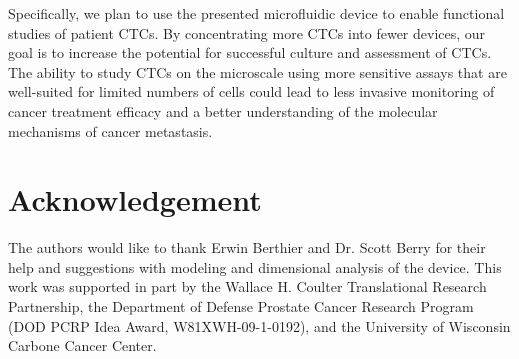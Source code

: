 Specifically, we plan to use the presented microfluidic device to enable functional studies of patient CTCs. By concentrating more CTCs into fewer devices, our goal is to increase the potential for successful culture and assessment of CTCs. The ability to study CTCs on the microscale using more sensitive assays that are well-suited for limited numbers of cells could lead to less invasive monitoring of cancer treatment efficacy and a better understanding of the molecular mechanisms of cancer metastasis.

\section{Acknowledgement}

The authors would like to thank Erwin Berthier and Dr. Scott Berry for their help and suggestions with modeling and dimensional analysis of the device.  This work was supported in part by the Wallace H. Coulter Translational Research Partnership, the Department of Defense Prostate Cancer Research Program (DOD PCRP Idea Award, W81XWH-09-1-0192), and the University of Wisconsin Carbone Cancer Center.
